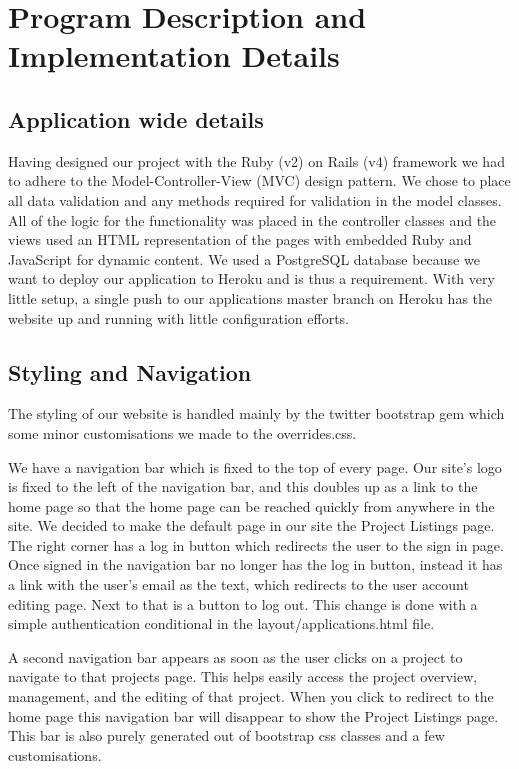 \documentclass[a4wide, 11pt]{article}
\begin{document}
\clearpage

\section{Program Description and Implementation Details}
\subsection{Application wide details}
Having designed our project with the Ruby (v2) on Rails (v4) framework we had to adhere to the Model-Controller-View (MVC) design pattern. We chose to place all data validation and any methods required for validation in the model classes. All of the logic for the functionality was placed in the controller classes and the views used an HTML representation of the pages with embedded Ruby and JavaScript for dynamic content. We used a PostgreSQL database because we want to deploy our application to Heroku and is thus a requirement. With very little setup, a single push to our applications master branch on Heroku has the website up and running with little configuration efforts.

\subsection{Styling and Navigation}
The styling of our website is handled mainly by the twitter bootstrap gem which some minor customisations we made to the overrides.css. 

We have a navigation bar which is fixed to the top of every page. Our site's logo is fixed to the left of the navigation bar, and this doubles up as a link to the home page so that the home page can be reached quickly from anywhere in the site. We decided to make the default page in our site the Project Listings page. The right corner has a log in button which redirects the user to the sign in page. Once signed in the navigation bar no longer has the log in button, instead it has a link with the user's email as the text, which redirects to the user account editing page. Next to that is a button to log out. This change is done with a simple authentication conditional in the layout/applications.html file.

A second navigation bar appears as soon as the user clicks on a project to navigate to that projects page. This helps easily access the project overview, management, and the editing of that project. When you click to redirect to the home page this navigation bar will disappear to show the Project Listings page. This bar is also purely generated out of bootstrap css classes and a few customisations.
\end{document}
